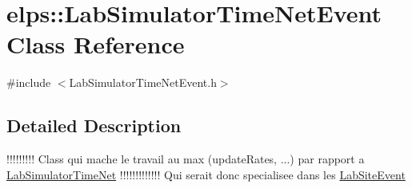 \hypertarget{classelps_1_1_lab_simulator_time_net_event}{\section{elps\+:\+:Lab\+Simulator\+Time\+Net\+Event Class Reference}
\label{classelps_1_1_lab_simulator_time_net_event}
}


{\ttfamily \#include $<$Lab\+Simulator\+Time\+Net\+Event.\+h$>$}



\subsection{Detailed Description}
!!!!!!!!! Class qui mache le travail au max (update\+Rates, ...) par rapport a \hyperlink{classelps_1_1_lab_simulator_time_net}{Lab\+Simulator\+Time\+Net} !!!!!!!!!!!!! Qui serait donc specialisee dans les \hyperlink{classelps_1_1_lab_site_event}{Lab\+Site\+Event} 